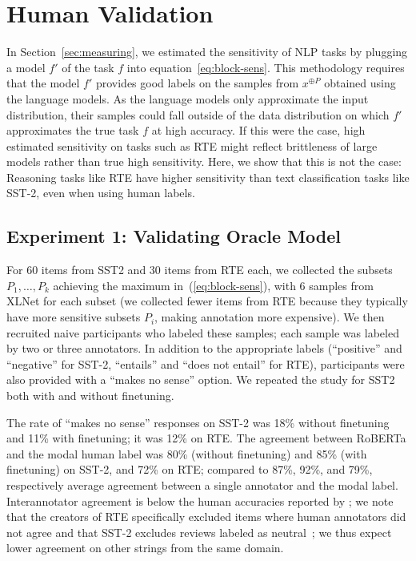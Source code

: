 \documentclass[11pt,a4paper]{article}
\begin{document}
\section{Human Validation}\label{sec:human}

In Section~\ref{sec:measuring}, we estimated the sensitivity of NLP tasks by plugging a model $f'$ of the task $f$ into equation~\ref{eq:block-sens}.
This methodology requires that the model $f'$ provides good labels on the samples from $x^{\oplus P}$ obtained using the language models.
As the language models only approximate the input distribution, their samples could fall outside of the data distribution on which $f'$ approximates the true task $f$ at high accuracy.
If this were the case, high estimated sensitivity on tasks such as RTE might reflect brittleness of large models rather than true high sensitivity.
Here, we show that this is not the case:
Reasoning tasks like RTE have higher sensitivity than text classification tasks like SST-2, even when using human labels.



\subsection{Experiment 1: Validating Oracle Model}





For 60 items from SST2 and 30 items from RTE each, we collected the subsets $P_1, \dots, P_k$ achieving the maximum in~(\ref{eq:block-sens}), with 6 samples from XLNet for each subset (we collected fewer items from RTE because they typically have more sensitive subsets $P_i$, making annotation more expensive). %
We then recruited naive participants who labeled these samples; each sample was labeled by two or three annotators.
In addition to the appropriate labels (``positive'' and ``negative'' for SST-2, ``entails'' and ``does not entail'' for RTE), participants were also provided with a ``makes no sense'' option.
We repeated the study for SST2 both with and without finetuning. %

The rate of ``makes no sense'' responses on SST-2 was 18\% without finetuning and 11\% with finetuning; it was 12\% on RTE.
The agreement between RoBERTa and the modal human label was 80\% (without finetuning) and 85\% (with finetuning) on SST-2, and 72\% on RTE; compared to 87\%, 92\%, and 79\%, respectively average agreement between a single annotator and the modal label.
Interannotator agreement is below the human accuracies reported by \citet{nangia2019human}; we note that the creators of RTE specifically excluded items where human annotators did not agree \citep{dagan2009recognizing} and that SST-2 excludes reviews labeled as neutral~\citep{socher2013recursive}; we thus expect lower agreement on other strings from the same domain.
\end{document}

